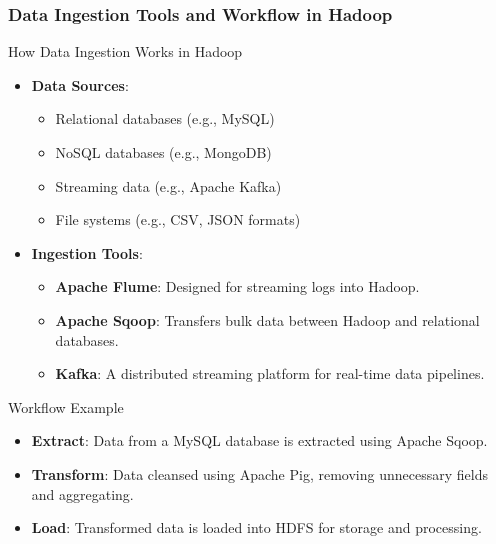 \documentclass[aspectratio=169]{beamer}
\begin{document}
\begin{frame}[fragile]
    \frametitle{Data Ingestion Tools and Workflow in Hadoop}
    \begin{block}{How Data Ingestion Works in Hadoop}
        \begin{itemize}
            \item \textbf{Data Sources}: 
                \begin{itemize}
                    \item Relational databases (e.g., MySQL)
                    \item NoSQL databases (e.g., MongoDB)
                    \item Streaming data (e.g., Apache Kafka)
                    \item File systems (e.g., CSV, JSON formats)
                \end{itemize}
            \item \textbf{Ingestion Tools}:
                \begin{itemize}
                    \item \textbf{Apache Flume}: Designed for streaming logs into Hadoop.
                    \item \textbf{Apache Sqoop}: Transfers bulk data between Hadoop and relational databases.
                    \item \textbf{Kafka}: A distributed streaming platform for real-time data pipelines.
                \end{itemize}
        \end{itemize}
    \end{block}

    \begin{block}{Workflow Example}
        \begin{itemize}
            \item \textbf{Extract}: Data from a MySQL database is extracted using Apache Sqoop. 
            \item \textbf{Transform}: Data cleansed using Apache Pig, removing unnecessary fields and aggregating.
            \item \textbf{Load}: Transformed data is loaded into HDFS for storage and processing.
        \end{itemize}
    \end{block}
\end{frame}
\end{document}
